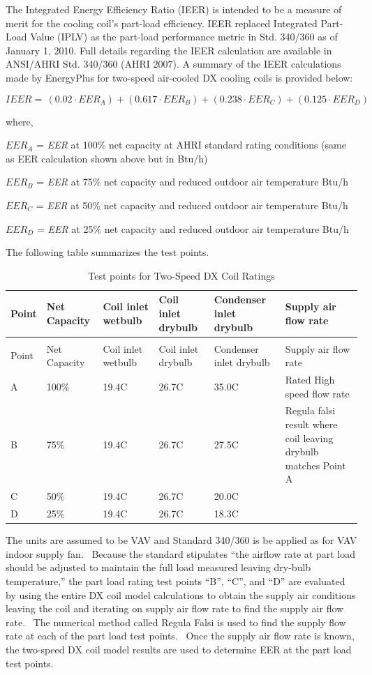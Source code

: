 The Integrated Energy Efficiency Ratio (IEER) is intended to be a measure of merit for the cooling coil's part-load efficiency. IEER replaced Integrated Part-Load Value (IPLV) as the part-load performance metric in Std. 340/360 as of January 1, 2010. Full details regarding the IEER calculation are available in ANSI/AHRI Std. 340/360 (AHRI 2007). A summary of the IEER calculations made by EnergyPlus for two-speed air-cooled DX cooling coils is provided below:

\begin{equation}
  IEER = \,(0.02 \cdot EE{R_A}) + (0.617 \cdot EE{R_B}) + (0.238 \cdot EE{R_C}) + (0.125 \cdot EE{R_D})
\end{equation}

where,

\(EER_A\) = \emph{EER} at 100\% net capacity at AHRI standard rating conditions (same as EER calculation shown above but in Btu/h)

\(EER_B\) = \emph{EER} at 75\% net capacity and reduced outdoor air temperature Btu/h

\(EER_C\) = \emph{EER} at 50\% net capacity and reduced outdoor air temperature Btu/h

\(EER_D\) = \emph{EER} at 25\% net capacity and reduced outdoor air temperature Btu/h

The following table summarizes the test points.

\begin{longtable}[c]{p{1.0in}p{1.0in}p{1.0in}p{1.0in}p{1.0in}p{1.0in}}
\caption{Test points for Two-Speed DX Coil Ratings \label{table:test-points-for-two-speed-dx-coil-ratings}} \tabularnewline
\toprule 
Point & Net Capacity & Coil inlet wetbulb & Coil inlet drybulb & Condenser inlet drybulb & Supply air flow rate \tabularnewline
\midrule
\endfirsthead

\caption[]{Test points for Two-Speed DX Coil Ratings} \tabularnewline
\toprule 
Point & Net Capacity & Coil inlet wetbulb & Coil inlet drybulb & Condenser inlet drybulb & Supply air flow rate \tabularnewline
\midrule
\endhead

A & 100\% & 19.4C & 26.7C & 35.0C & Rated High speed flow rate \tabularnewline
B & 75\% & 19.4C & 26.7C & 27.5C & Regula falsi result where coil leaving drybulb matches Point A \tabularnewline
C & 50\% & 19.4C & 26.7C & 20.0C \tabularnewline
D & 25\% & 19.4C & 26.7C & 18.3C \tabularnewline
\bottomrule
\end{longtable}

The units are assumed to be VAV and Standard 340/360 is be applied as for VAV indoor supply fan.~ Because the standard stipulates ``the airflow rate at part load should be adjusted to maintain the full load measured leaving dry-bulb temperature,'' the part load rating test points ``B'', ``C'', and ``D'' are evaluated by using the entire DX coil model calculations to obtain the supply air conditions leaving the coil and iterating on supply air flow rate to find the supply air flow rate.~ The numerical method called Regula Falsi is used to find the supply flow rate at each of the part load test points.~ Once the supply air flow rate is known, the two-speed DX coil model results are used to determine EER at the part load test points.

